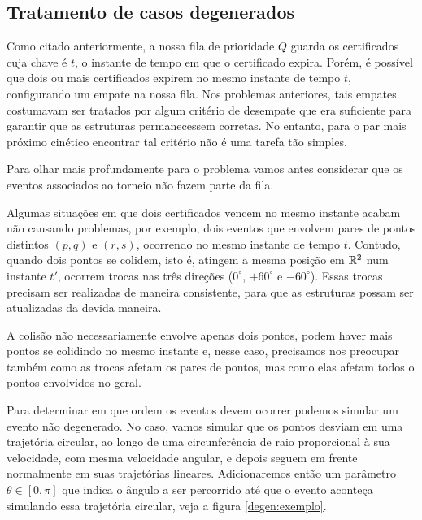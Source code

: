 
\FloatBarrier
\subsection{Tratamento de casos degenerados}

Como citado anteriormente, a nossa fila de prioridade $Q$ guarda os
certificados cuja chave é $t$, o instante de tempo em que o
certificado expira. Porém, é possível que dois ou mais certificados
expirem no mesmo instante de tempo $t$, configurando um empate na
nossa fila. Nos problemas anteriores, tais empates costumavam ser
tratados por algum critério de desempate que era suficiente para
garantir que as estruturas permanecessem corretas. No entanto, para
o par mais próximo cinético encontrar tal critério não é uma tarefa
tão simples.

Para olhar mais profundamente para o problema vamos antes considerar
que os eventos associados ao torneio não fazem parte da fila.

Algumas situações em que dois certificados vencem no mesmo instante
acabam não causando problemas, por exemplo, dois eventos que
envolvem pares de pontos distintos $(p, q)$ e $(r, s)$, ocorrendo no
mesmo instante de tempo $t$. Contudo, quando dois pontos se colidem,
isto é, atingem a mesma posição em $\mathbb{R}^2$ num instante $t'$,
ocorrem trocas nas três direções ($0^\circ$, $+60^\circ$ e
$-60^\circ$). Essas trocas precisam ser realizadas de maneira
consistente, para que as estruturas possam ser atualizadas da devida
maneira.

A colisão não necessariamente envolve apenas dois pontos, podem
haver mais pontos se colidindo no mesmo instante e, nesse caso,
precisamos nos preocupar também como as trocas afetam os pares de
pontos, mas como elas afetam todos o pontos envolvidos no geral.

Para determinar em que ordem os eventos devem ocorrer podemos
simular um evento não degenerado. No caso, vamos simular que os
pontos desviam em uma trajetória circular, ao longo de uma
circunferência de raio proporcional à sua velocidade, com mesma
velocidade angular, e depois seguem em frente normalmente em suas
trajetórias lineares. Adicionaremos então um parâmetro $\theta \in
[0, \pi]$ que indica o ângulo a ser percorrido até que o evento
aconteça simulando essa trajetória circular, veja a figura
\ref{degen:exemplo}.




